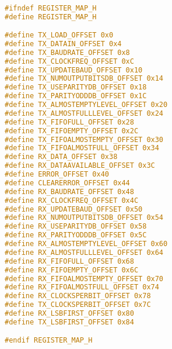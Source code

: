 \begin{lstlisting}[language=C,frame=single,label={lst:header}]

#ifndef REGISTER_MAP_H
#define REGISTER_MAP_H

#define TX_LOAD_OFFSET 0x0
#define TX_DATAIN_OFFSET 0x4
#define TX_BAUDRATE_OFFSET 0x8
#define TX_CLOCKFREQ_OFFSET 0xC
#define TX_UPDATEBAUD_OFFSET 0x10
#define TX_NUMOUTPUTBITSDB_OFFSET 0x14
#define TX_USEPARITYDB_OFFSET 0x18
#define TX_PARITYODDDB_OFFSET 0x1C
#define TX_ALMOSTEMPTYLEVEL_OFFSET 0x20
#define TX_ALMOSTFULLLEVEL_OFFSET 0x24
#define TX_FIFOFULL_OFFSET 0x28
#define TX_FIFOEMPTY_OFFSET 0x2C
#define TX_FIFOALMOSTEMPTY_OFFSET 0x30
#define TX_FIFOALMOSTFULL_OFFSET 0x34
#define RX_DATA_OFFSET 0x38
#define RX_DATAAVAILABLE_OFFSET 0x3C
#define ERROR_OFFSET 0x40
#define CLEARERROR_OFFSET 0x44
#define RX_BAUDRATE_OFFSET 0x48
#define RX_CLOCKFREQ_OFFSET 0x4C
#define RX_UPDATEBAUD_OFFSET 0x50
#define RX_NUMOUTPUTBITSDB_OFFSET 0x54
#define RX_USEPARITYDB_OFFSET 0x58
#define RX_PARITYODDDB_OFFSET 0x5C
#define RX_ALMOSTEMPTYLEVEL_OFFSET 0x60
#define RX_ALMOSTFULLLEVEL_OFFSET 0x64
#define RX_FIFOFULL_OFFSET 0x68
#define RX_FIFOEMPTY_OFFSET 0x6C
#define RX_FIFOALMOSTEMPTY_OFFSET 0x70
#define RX_FIFOALMOSTFULL_OFFSET 0x74
#define RX_CLOCKSPERBIT_OFFSET 0x78
#define TX_CLOCKSPERBIT_OFFSET 0x7C
#define RX_LSBFIRST_OFFSET 0x80
#define TX_LSBFIRST_OFFSET 0x84

#endif REGISTER_MAP_H
\end{lstlisting}

